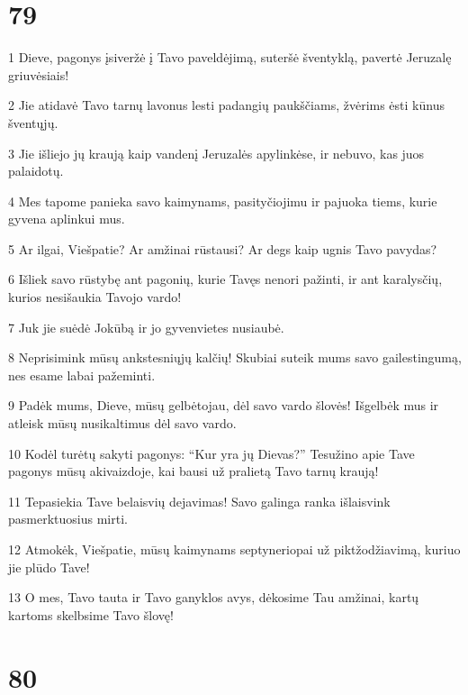 \chapter{79}


\par 1 Dieve, pagonys įsiveržė į Tavo paveldėjimą, suteršė šventyklą, pavertė Jeruzalę griuvėsiais! 
\par 2 Jie atidavė Tavo tarnų lavonus lesti padangių paukščiams, žvėrims ėsti kūnus šventųjų. 
\par 3 Jie išliejo jų kraują kaip vandenį Jeruzalės apylinkėse, ir nebuvo, kas juos palaidotų. 
\par 4 Mes tapome panieka savo kaimynams, pasityčiojimu ir pajuoka tiems, kurie gyvena aplinkui mus. 
\par 5 Ar ilgai, Viešpatie? Ar amžinai rūstausi? Ar degs kaip ugnis Tavo pavydas? 
\par 6 Išliek savo rūstybę ant pagonių, kurie Tavęs nenori pažinti, ir ant karalysčių, kurios nesišaukia Tavojo vardo! 
\par 7 Juk jie suėdė Jokūbą ir jo gyvenvietes nusiaubė. 
\par 8 Neprisimink mūsų ankstesniųjų kalčių! Skubiai suteik mums savo gailestingumą, nes esame labai pažeminti. 
\par 9 Padėk mums, Dieve, mūsų gelbėtojau, dėl savo vardo šlovės! Išgelbėk mus ir atleisk mūsų nusikaltimus dėl savo vardo. 
\par 10 Kodėl turėtų sakyti pagonys: “Kur yra jų Dievas?” Tesužino apie Tave pagonys mūsų akivaizdoje, kai bausi už pralietą Tavo tarnų kraują! 
\par 11 Tepasiekia Tave belaisvių dejavimas! Savo galinga ranka išlaisvink pasmerktuosius mirti. 
\par 12 Atmokėk, Viešpatie, mūsų kaimynams septyneriopai už piktžodžiavimą, kuriuo jie plūdo Tave! 
\par 13 O mes, Tavo tauta ir Tavo ganyklos avys, dėkosime Tau amžinai, kartų kartoms skelbsime Tavo šlovę!


\chapter{80}


